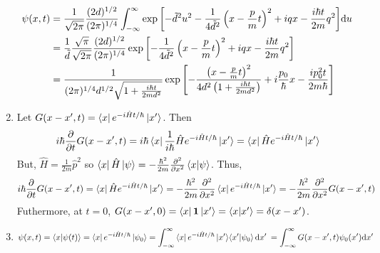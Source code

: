 \documentclass[12pt]{extarticle}
\begin{document}
\begin{enumerate}
\begin{align*}
 \psi(x, t) &=  \frac{1}{\sqrt{2 \pi}} \frac{(2d)^{1/2}}{(2 \pi)^{1/4}} \int_{-\infty}^{\infty} \exp{\left[-\tilde{d}^2 u^2 - \frac{1}{4 \tilde{d}^2} \left(x - \frac{p}{m} t \right)^2 + iqx - \frac{i \hbar t}{2m} q^2 \right]} \mathrm{d}u \:  \\ &= \frac{1}{\tilde{d}}\frac{\sqrt{\pi}}{\sqrt{2 \pi}} \frac{(2d)^{1/2}}{(2 \pi)^{1/4}} \exp{\left[- \frac{1}{4 \tilde{d}^2} \left(x - \frac{p}{m} t \right)^2 + iqx - \frac{i \hbar t}{2m} q^2 \right]} \\ &= \frac{1}{(2 \pi)^{1/4} d^{1/2} \sqrt{1 + \frac{i \hbar t}{2md^2}}} \exp{\left[- \frac{\left(x - \frac{p}{m} t \right)^2}{4 d^2 \left(1 + \frac{i \hbar t}{2md^2} \right)} + i \frac{p_0}{\hbar}x - \frac{i p_0^2 t}{2m \hbar} \right]}
\end{align*}

\item Let $G(x - x', t) = \left< x \right| e^{-i \hat{H} t /\hbar} \left| x' \right>$. Then \[i \hbar \frac{\partial}{\partial t} G(x - x', t) = i \hbar \left< x \right| \frac{1}{i\hbar} \hat{H} e^{-i \hat{H} t /\hbar} \left| x' \right> = \left< x \right| \hat{H} e^{-i \hat{H} t /\hbar} \left| x' \right> \]
But, $\hat{H} = \frac{1}{2m} \hat{p}^2$ so $\left< x \right| \hat{H} \left| \psi \right> = -\frac{\hbar^2}{2m} \frac{\partial^2}{\partial x^2} \left< x | \psi \right>$. Thus,
\[i \hbar \frac{\partial}{\partial t} G(x - x', t) = \left< x \right| \hat{H} e^{-i \hat{H} t /\hbar} \left| x' \right> = -\frac{\hbar^2}{2m} \frac{\partial^2}{\partial x^2} \left< x \right| e^{-i \hat{H} t /\hbar} \left| x' \right> = -\frac{\hbar^2}{2m} \frac{\partial^2}{\partial x^2} G(x - x', t)  \]
Futhermore, at $t = 0$, $G(x - x', 0) = \left< x \right| \mathbf{1} \left| x' \right> = \left< x | x' \right> = \delta(x - x')$. 

\item \[\psi(x, t) = \left< x | \psi(t) \right> = \left< x \right| e^{-i \hat{H} t /\hbar} \left| \psi_0 \right> = \int_{-\infty}^{\infty} \left< x \right| e^{-i \hat{H} t /\hbar} \left| x' \right> \! \left< x' | \psi_0 \right> \mathrm{d}x' \: = \int_{-\infty}^{\infty} G(x - x', t) \psi_0(x') \mathrm{d}x' \:\]


\end{enumerate}
\end{document}
